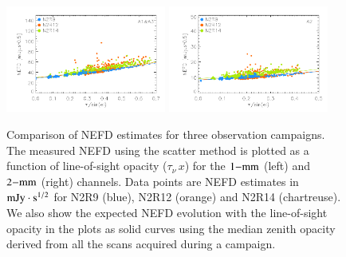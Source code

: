 \documentclass[traditionalabstract]{aa}
\newcommand{\taunu}{\tau_{\nu}}
\begin{document}
{\begin{figure}[!thbp]
\begin{center}
\includegraphics[clip=true,width=0.47\textwidth]{Figures/plot_nefd_vs_obstau_corrected_skydip_vfinal_1mm.pdf}
\includegraphics[clip=true,width=0.47\textwidth]{Figures/plot_nefd_vs_obstau_corrected_skydip_vfinal_a2.pdf}
\caption{Comparison of NEFD estimates for three observation
  campaigns. The measured NEFD using the scatter method is plotted as a function of
  line-of-sight opacity ($\taunu\,x$) for the $1\rm{-mm}$ (left) and $2\rm{-mm}$ (right)
  channels. Data points are NEFD estimates in $\rm{mJy}\cdot s^{1/2}$ for N2R9 (blue), N2R12 (orange)
  and N2R14 (chartreuse). We also show the expected NEFD evolution
  with the line-of-sight opacity in the plots as solid curves using the median
  zenith opacity derived from all the scans acquired during a campaign.}
\label{fig:nefdvsbackground_below_1Jy}
\end{center}
\end{figure}

}
\end{document}

